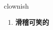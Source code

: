 
\begin{frame}
{\huge clownish}
\begin{center}
\begin{enumerate}\Large
  \item \textbf{滑稽可笑的}
\end{enumerate}
\end{center}
\end{frame}
